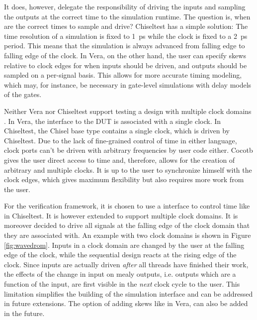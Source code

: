 It does, however, delegate the responsibility of driving the inputs and sampling the outputs at the correct time to the simulation
runtime. The question is, when are the correct times to sample and
drive? Chiseltest has a simple solution: The time resolution of a simulation is fixed to \SI{1}{ps} while the clock
is fixed to a \SI{2}{ps} period. This means that the simulation is always advanced from falling edge to falling edge
of the clock. In Vera, on the other hand, the user can specify skews relative to clock edges for when inputs should be driven, and outputs should be sampled on a per-signal basis. This allows for more accurate timing modeling, which may, for instance, be necessary in gate-level simulations with delay models of the gates.

Neither Vera nor Chiseltest support testing a design with multiple clock domains \cite[Sec.
7]{flake2020a}\cite{chiseltest_multiclock}. In Vera, the interface to the DUT is associated with a single clock. In
Chiseltest, the Chisel  base type contains a single clock, which is driven by Chiseltest. Due to the lack of
fine-grained control of time in either language, clock ports can't be driven with arbitrary frequencies by user code either. Cocotb gives the user direct access to time and, therefore, allows for the creation of arbitrary and multiple clocks. It is up to the user to synchronize himself with the clock edges, which gives maximum flexibility but also requires more work from the user. 

For the verification framework, it is chosen to use a  interface to control time like in Chiseltest. It is
however extended to support multiple clock domains. It is moreover decided to drive all signals at the falling edge of the
clock domain that they are associated with. An example with two clock domains is shown in Figure \ref{fig:wavedrom}. Inputs in a clock domain are changed by the user at the falling edge of the clock, while the sequential design reacts at the rising edge of the clock. Since inputs are actually driven \textit{after} all threads have finished their work, the effects of the change in input on mealy outputs, i.e. outputs which are a function of the input, are first visible in the \textit{next} clock cycle to the user. This limitation simplifies the building of the simulation interface and can be addressed in future extensions. The option of adding skews like in Vera, can also be added in the future. 

